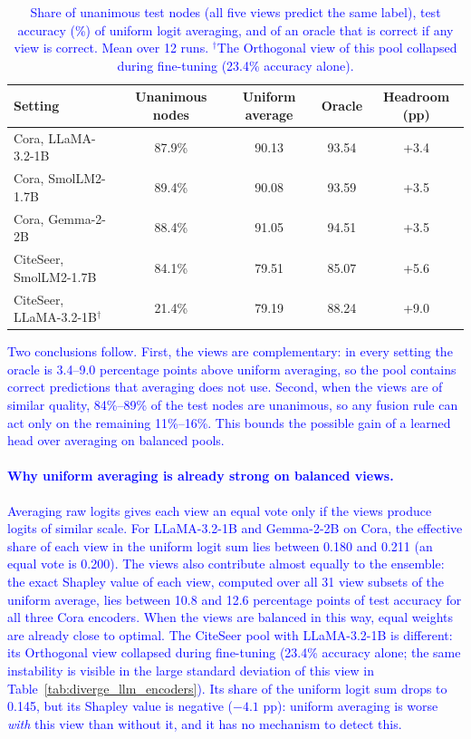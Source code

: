 \documentclass[a4paper,fleqn]{cas-sc}
\newcommand{\revtwo}[1]{\textcolor{blue}{#1}}  %
\begin{document}
\begin{table}[ht]
\centering
\caption{\revtwo{Share of unanimous test nodes (all five views predict the same label), test accuracy (\%) of uniform logit averaging, and of an oracle that is correct if any view is correct. Mean over 12 runs. $^\dagger$The Orthogonal view of this pool collapsed during fine-tuning (23.4\% accuracy alone).}}
\label{tab:ens_agreement}
\begin{tabular}{l c c c c}
\hline
Setting & Unanimous nodes & Uniform average & Oracle & Headroom (pp) \\
\hline
Cora, LLaMA-3.2-1B        & 87.9\% & 90.13 & 93.54 & +3.4 \\
Cora, SmolLM2-1.7B        & 89.4\% & 90.08 & 93.59 & +3.5 \\
Cora, Gemma-2-2B          & 88.4\% & 91.05 & 94.51 & +3.5 \\
CiteSeer, SmolLM2-1.7B    & 84.1\% & 79.51 & 85.07 & +5.6 \\
CiteSeer, LLaMA-3.2-1B$^\dagger$ & 21.4\% & 79.19 & 88.24 & +9.0 \\
\hline
\end{tabular}
\end{table}

\revtwo{Two conclusions follow. First, the views are complementary: in every setting the oracle is 3.4--9.0 percentage points above uniform averaging, so the pool contains correct predictions that averaging does not use. Second, when the views are of similar quality, 84\%--89\% of the test nodes are unanimous, so any fusion rule can act only on the remaining 11\%--16\%. This bounds the possible gain of a learned head over averaging on balanced pools.}

\paragraph{\revtwo{Why uniform averaging is already strong on balanced views.}}
\revtwo{Averaging raw logits gives each view an equal vote only if the views produce logits of similar scale. For LLaMA-3.2-1B and Gemma-2-2B on Cora, the effective share of each view in the uniform logit sum lies between 0.180 and 0.211 (an equal vote is 0.200). The views also contribute almost equally to the ensemble: the exact Shapley value of each view, computed over all 31 view subsets of the uniform average, lies between 10.8 and 12.6 percentage points of test accuracy for all three Cora encoders. When the views are balanced in this way, equal weights are already close to optimal. The CiteSeer pool with LLaMA-3.2-1B is different: its Orthogonal view collapsed during fine-tuning (23.4\% accuracy alone; the same instability is visible in the large standard deviation of this view in Table~\ref{tab:diverge_llm_encoders}). Its share of the uniform logit sum drops to 0.145, but its Shapley value is negative ($-4.1$ pp): uniform averaging is worse \emph{with} this view than without it, and it has no mechanism to detect this.}
\end{document}
